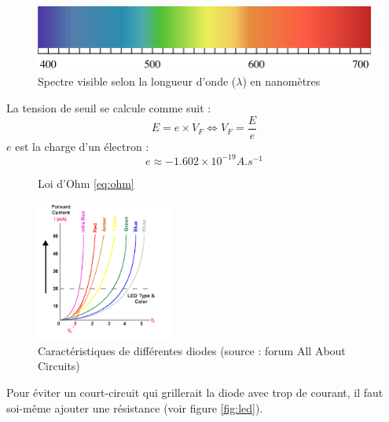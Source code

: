 \documentclass[11pt,a4paper,oneside,twocolumn]{article}
\begin{document}
\begin{figure}[ht]
	\centering
	\includegraphics[width=\linewidth]{visible.png}
	\caption{Spectre visible selon la longueur d'onde ($\lambda$) en nanomètres}
	\label{fig:wave}
\end{figure}

La tension de seuil se calcule comme suit :
\begin{equation}\label{eq:led}
E=e\times V_F \iff V_F=\frac Ee
\end{equation}
$e$ est la charge d'un électron :
\begin{equation}
e\approx-1.602\times10^{-19}\si{A.s^{-1}}
\end{equation}

\begin{figure}[ht]
	\centering
	\caption{Loi d'Ohm \eqref{eq:ohm}}
	\label{fig:ohm}
\end{figure}

\begin{figure}[ht]
	\centering
	\includegraphics[width=0.4\textwidth]{lediv.png}
	\caption{Caractéristiques de différentes diodes
		(source : forum All About Circuits)}
	\label{fig:diode}
\end{figure}

Pour éviter un court-circuit qui grillerait la diode avec trop de courant, il
faut soi-même ajouter une résistance (voir figure \ref{fig:led}).
\end{document}
